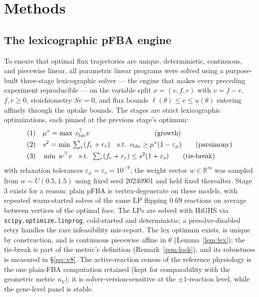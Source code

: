 \documentclass[11pt,a4paper]{article}
\theoremstyle{plain}
\theoremstyle{definition}
\theoremstyle{remark}
\newcommand{\kk}{\kappa_{\!V}}
\newcommand{\RR}{\mathbb{R}}
\begin{document}
\section{Methods}\label{sec:methods}


\subsection{The lexicographic pFBA engine}\label{sec:engine}

To ensure that optimal flux trajectories are unique, deterministic,
continuous, and piecewise linear, all parametric linear programs were
solved using a purpose-built three-stage lexicographic solver --- the
engine that makes every preceding experiment reproducible --- on the
variable split $x = (v, f,
r)$ with $v = f - r$, $f, r \ge 0$, stoichiometry $Sv = 0$, and
flux bounds $\ell(\theta) \le v \le u(\theta)$ entering affinely
through the uptake bounds. The stages are strict lexicographic
optimizations, each pinned at the previous stage's optimum:
\begin{align}
\text{(1)}\quad & \mu^* = \max\; c_{\mathrm{bio}}^\top v
  \qquad\qquad\qquad\qquad\quad\; \text{(growth)} \notag\\
\text{(2)}\quad & s^2 = \min\; \textstyle\sum_r (f_r + r_r)
  \quad\text{s.t. } v_{\mathrm{bio}} \ge \mu^*(1 - \varepsilon_\mu)
  \qquad \text{(parsimony)} \notag\\
\text{(3)}\quad & \min\; w^\top v
  \quad\text{s.t. } \textstyle\sum_r (f_r + r_r) \le s^2(1 +
  \varepsilon_s) \qquad \text{(tie-break)} \notag
\end{align}
with relaxation tolerances $\varepsilon_\mu = \varepsilon_s =
10^{-9}$; the weight vector $w \in \RR^m$ was sampled from
$w \sim U(0.5, 1.5)$ using fixed seed 20240901 and held fixed
thereafter.
Stage 3 exists for a reason: plain pFBA is vertex-degenerate on these
models, with repeated warm-started solves of the same LP flipping
$0.69$ reactions on average between vertices of the optimal face. The
LPs are solved with HiGHS
\citep{huangfu2018} via \texttt{scipy.optimize.linprog}, cold-started
and deterministic; a presolve-disabled retry handles the rare
infeasibility mis-report. The lex optimum exists, is unique by
construction, and is continuous piecewise affine in $\theta$
(Lemma~\ref{lem:lex}); the tie-break is part of the metric's
definition (Remark~\ref{rem:lock}), and its robustness is measured in \S\ref{sec:v8}. The active-reaction census of the reference physiology is the one plain-FBA computation retained (kept for comparability with the geometric metric $\kk$); it is solver-version-sensitive at the $\pm 1$-reaction
level, while the gene-level panel is stable.
\end{document}
